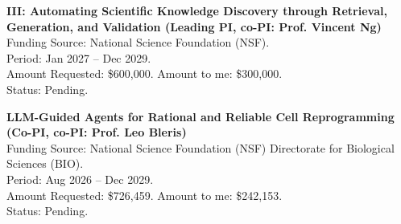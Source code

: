 \noindent \textbf{III: Automating Scientific Knowledge Discovery through Retrieval, Generation, and Validation (Leading PI, co-PI: Prof. Vincent Ng)} \\
\indent Funding Source: National Science Foundation (NSF). \\
\indent Period: Jan 2027 -- Dec 2029. \\
\indent Amount Requested: \$600,000. Amount to me: \$300,000. \\
\indent Status: Pending.

\noindent \textbf{LLM-Guided Agents for Rational and Reliable Cell Reprogramming (Co-PI, co-PI: Prof. Leo Bleris)} \\
\indent Funding Source: National Science Foundation (NSF) Directorate for Biological Sciences (BIO). \\
\indent Period: Aug 2026 -- Dec 2029. \\
\indent Amount Requested: \$726,459. Amount to me: \$242,153. \\
\indent Status: Pending. \\
